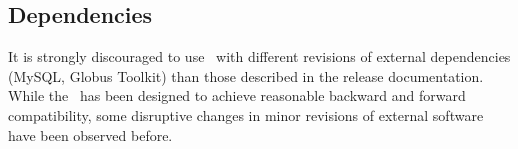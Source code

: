 \subsection{Dependencies}

It is strongly discouraged to use \LB\ with different revisions
of external dependencies (MySQL, Globus Toolkit)
than those described in the release documentation. While the \LB\ has been designed to achieve
reasonable backward and forward compatibility, some disruptive changes in minor revisions
of external software have been observed before.

\endinput
